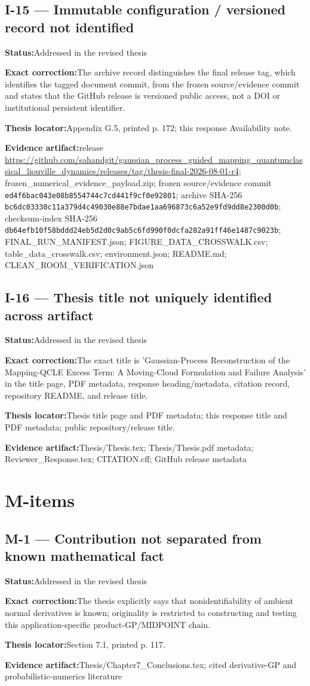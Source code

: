 \documentclass[11pt]{article}
\newcommand{\field}[2]{\textbf{#1}\quad #2\par}
\begin{document}
\subsection*{I-15 --- Immutable configuration / versioned record not identified}
\field{Status:}{Addressed in the revised thesis}
\field{Exact correction:}{The archive record distinguishes the final release tag, which identifies the tagged document commit, from the frozen source/evidence commit and states that the GitHub release is versioned public access, not a DOI or institutional persistent identifier.}
\field{Thesis locator:}{Appendix G.5, printed p. 172; this response Availability note.}
\field{Evidence artifact:}{release \url{https://github.com/sahandgit/gaussian_process_guided_mapping_quantumclassical_liouville_dynamics/releases/tag/thesis-final-2026-08-01-r4}; frozen\_numerical\_evidence\_payload.zip; frozen source/evidence commit \texttt{ed4f6bac\allowbreak{}043e08b8\allowbreak{}554744c7\allowbreak{}cd441f9c\allowbreak{}f0e92801}; archive SHA-256 \texttt{bc6dc033\allowbreak{}30c11a37\allowbreak{}9d4c4903\allowbreak{}0e88e7bd\allowbreak{}ae1aa696\allowbreak{}873c6a52\allowbreak{}e9fd9dd8\allowbreak{}e2300d0b}; checksum-index SHA-256 \texttt{db64efb1\allowbreak{}0f58bddd\allowbreak{}24eb5d2d\allowbreak{}0c9ab5c6\allowbreak{}fd990f0d\allowbreak{}cfa282a9\allowbreak{}1ff46e14\allowbreak{}87c9023b}; FINAL\_RUN\_MANIFEST.json; FIGURE\_DATA\_CROSSWALK.csv; table\_data\_crosswalk.csv; environment.json; README.md; CLEAN\_ROOM\_VERIFICATION.json}
\subsection*{I-16 --- Thesis title not uniquely identified across artifact}
\field{Status:}{Addressed in the revised thesis}
\field{Exact correction:}{The exact title is 'Gaussian-Process Reconstruction of the Mapping-QCLE Excess Term: A Moving-Cloud Formulation and Failure Analysis' in the title page, PDF metadata, response heading/metadata, citation record, repository README, and release title.}
\field{Thesis locator:}{Thesis title page and PDF metadata; this response title and PDF metadata; public repository/release title.}
\field{Evidence artifact:}{Thesis/Thesis.tex; Thesis/Thesis.pdf metadata; Reviewer\_Response.tex; CITATION.cff; GitHub release metadata}
\section*{M-items}
\subsection*{M-1 --- Contribution not separated from known mathematical fact}
\field{Status:}{Addressed in the revised thesis}
\field{Exact correction:}{The thesis explicitly says that nonidentifiability of ambient normal derivatives is known; originality is restricted to constructing and testing this application-specific product-GP/MIDPOINT chain.}
\field{Thesis locator:}{Section 7.1, printed p. 117.}
\field{Evidence artifact:}{Thesis/Chapter7\_Conclusions.tex; cited derivative-GP and probabilistic-numerics literature}
\end{document}
